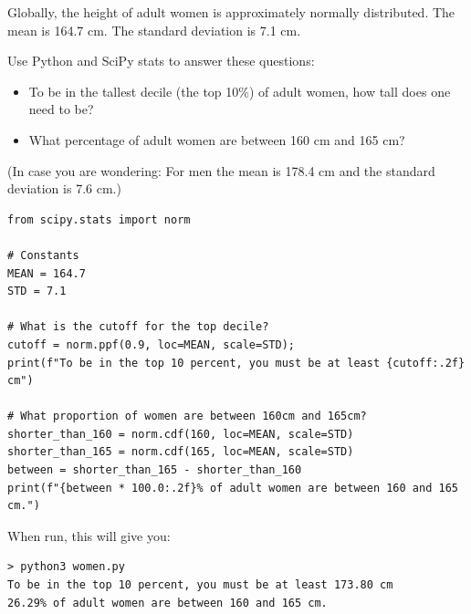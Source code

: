 \begin{Exercise}[title={SciPy Stats}, label=scipy_ppf]

Globally,  the height of adult women is approximately normally distributed.  The mean is 164.7 cm.  The standard deviation is 7.1 cm.

Use Python and SciPy stats to answer these questions: 

\begin{itemize}
\item To be in the tallest decile (the top 10\%) of adult women,  how tall does one need to be? 

\item What percentage of adult women are between 160 cm and 165 cm?

\end{itemize}

(In case you are wondering: For men the mean is 178.4 cm and the standard deviation is 7.6 cm.)

\end{Exercise}
\begin{Answer}[ref=scipy_ppf]

\begin{verbatim}
from scipy.stats import norm

# Constants
MEAN = 164.7 
STD = 7.1

# What is the cutoff for the top decile?
cutoff = norm.ppf(0.9, loc=MEAN, scale=STD);
print(f"To be in the top 10 percent, you must be at least {cutoff:.2f} cm")

# What proportion of women are between 160cm and 165cm?
shorter_than_160 = norm.cdf(160, loc=MEAN, scale=STD)
shorter_than_165 = norm.cdf(165, loc=MEAN, scale=STD)
between = shorter_than_165 - shorter_than_160
print(f"{between * 100.0:.2f}% of adult women are between 160 and 165 cm.")
\end{verbatim}

When run,  this will give you:

\begin{verbatim}
> python3 women.py
To be in the top 10 percent, you must be at least 173.80 cm
26.29% of adult women are between 160 and 165 cm.
\end{verbatim}

\end{Answer}
